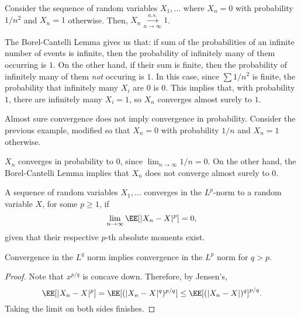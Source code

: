 \begin{example}
\exlabel

Consider the sequence of random variables $X_1, \hdots$ where $X_n=0$ with probability $1/n^2$ and $X_n=1$ otherwise. Then, $X_n\overset{a.s.}{\underset{n\rightarrow \infty}{\longrightarrow}} 1$. 
\end{example}

The Borel-Cantelli Lemma gives us that: if sum of the probabilities of an infinite number of events is infinite, then the probability of infinitely many of them occurring is $1$. On the other hand, if their sum is finite, then the probability of infinitely many of them \textit{not} occuring is $1$. In this case, since $\sum 1/n^2$ is finite, the probability that infinitely many $X_i$ are $0$ is $0$. This implies that, with probability $1$, there are infinitely many $X_i=1$, so $X_n$ converges almost surely to $1$. 

\begin{example}
\exlabel

Almost sure convergence does not imply convergence in probability. Consider the previous example, modified so that $X_n=0$ with probability $1/n$ and $X_n=1$ otherwise. 
\end{example}

$X_n$ converges in probability to $0$, since $\lim_{n\rightarrow \infty}1/n = 0$. On the other hand, the Borel-Cantelli Lemma implies that $X_n$ does not converge almost surely to $0$. 

\begin{definition}

A sequence of random variables $X_1, \hdots$ converges in the $L^p$-norm to a random variable $X$, for some $p\geq 1$, if 
\[\lim_{n\rightarrow \infty}\EE[\vert X_n - X\vert^p] = 0,\]
given that their respective $p$-th absolute moments exist. 
\end{definition}

\begin{theorem}
\lemlabel

Convergence in the $L^q$ norm implies convergence in the $L^p$ norm for $q > p$. 
\end{theorem}

\begin{proof}
Note that $x^{p/q}$ is concave down. Therefore, by Jensen's, 
\[\EE[\vert X_n-X\vert^p] = \EE[(\vert X_n-X\vert^q)^{p/q}] \leq \EE[(\vert X_n-X\vert)^q]^{p/q}.\]
Taking the limit on both sides finishes. 
\end{proof}

